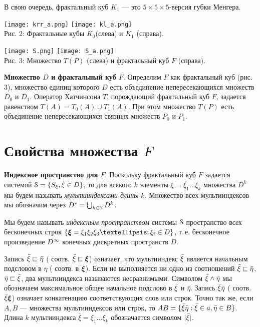   В свою очередь, фрактальный куб $ K_1$ --- это $ 5\times 5\times 5 $-версия губки Менгера.



\begin{center}
\qquad\qquad
\texttt{[image: krr\_a.png]}
\hfill
\texttt{[image: kl\_a.png]}\qquad\qquad\\
[1ex]
{\footnotesize Рис. 2: Фрактальные кубы $K_0$(слева)  и  $K_1$ (справа).}
\end{center}

\begin{center}
\qquad\qquad\texttt{[image: S.png]}
\hfill
\texttt{[image: S\_a.png]}\qquad\qquad\\
[1ex]
{\footnotesize Рис. 3: Множество $T(P)$ (слева)  и фрактальный куб $F$ (справа).}
\end{center}



{\bf Множество $ D$ и фрактальный куб $F$}.  Определим $F$ как фрактальный куб (рис. 3), множество единиц которого  $ D$ есть объединение непересекающихся множеств $ D_0$  и  $ D_1$. Оператор Хатчинсона $T$, порождающий фрактальный куб $F$, задается равенством $T(A)=T_0(A)\cup T_1(A)$. При этом множество $T(P)$ есть объединение непересекающихся связных множеств $P_0$  и $P_1$.




\section{Свойства множества $F$}
\setcounter{equation}{0}

{\bf Индексное пространство для $F$}.
Поскольку фрактальный куб $F$ задается системой ${\EuScript S}=\{S_\xi, \xi\in D\}$, то
для всякого $k$ элементы $\bar\xi=\xi_1\ldots\xi_k$ множества $ D^k$ мы будем называть {\it мультииндексами длины} $k$.
Множество всех мультииндексов мы обозначим через $ D^*=\bigcup_{k\in\mathbb{N}} D^k$.

Мы будем называть {\em индексным пространством} системы ${\EuScript S}$  пространство всех бесконечных строк  $\{\bmx=\xi_1\xi_2\xi_3…;\xi_i\in  D\}$, т.\,е. бесконечное произведение $D^\infty$ конечных дискретных пространств $D$.

Запись ${\bar{\xi}}\sqsubset \bar\eta$ ( соотв. ${\bar{\xi}}\sqsubset {\bm{\xi}}$) означает, что
мультииндекс ${\bar{\xi}}$ является начальным подсловом в $\bar\eta$ ( соотв. в ${\bm{\xi}}$).
Если не выполняется ни одно из соотношений ${\bar{\xi}}\sqsubset \bar\eta$, $ \bar\eta\sqsubset{\bar{\xi}}$, два мультииндекса называются несравнимыми. Символом
${\bar{\xi}}\wedge \bar\eta$ мы обозначаем максимальное общее начальное подслово в
${\bar{\xi}}$  и  $\bar\eta$. Запись ${\bar{\xi}}\bar\eta$ ( соотв. ${\bar{\xi}}{\bm{\xi}}$) означает конкатенацию соответствующих слов или строк. Точно так же, если $A,B$ --- множества мультииндексов или строк, то $AB=\{{\bar{\xi}}\bar\eta: {\bar{\xi}}\in a,\bar\eta\in B\}$.   Длина $k$ мультииндекса $\bar\xi=\xi_1\ldots\xi_k$ обозначается символом $|{\bar{\xi}}|$.

